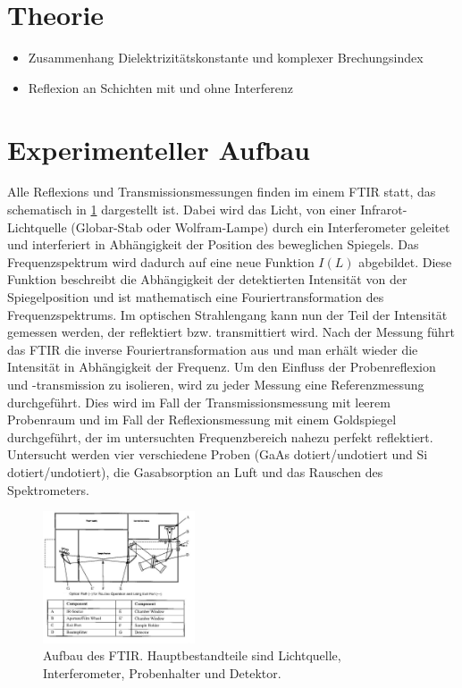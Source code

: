 \documentclass[paper=a4,fontsize=10pt,DIV=18,twocolumn,parskip=half]{scrartcl}
\numberwithin{equation}{section}    %
\begin{document}

\section{Theorie}
\begin{itemize}
\item Zusammenhang Dielektrizitätskonstante und komplexer Brechungsindex
\item Reflexion an Schichten mit und ohne Interferenz
\end{itemize}


\section{Experimenteller Aufbau}

Alle Reflexions und Transmissionsmessungen finden im einem  FTIR statt, das schematisch in \ref{ftir} dargestellt ist. Dabei wird das Licht, von einer Infrarot-Lichtquelle (Globar-Stab oder Wolfram-Lampe) durch ein Interferometer geleitet und interferiert in Abhängigkeit der Position des beweglichen Spiegels. Das Frequenzspektrum wird dadurch auf eine neue Funktion $I(L)$ abgebildet. Diese Funktion beschreibt die Abhängigkeit der detektierten Intensität von der Spiegelposition und ist mathematisch eine Fouriertransformation des Frequenzspektrums. Im optischen Strahlengang kann nun der Teil der Intensität gemessen werden, der reflektiert bzw. transmittiert wird. Nach der Messung führt das FTIR die inverse Fouriertransformation aus und man erhält wieder die  Intensität in Abhängigkeit der Frequenz. Um den Einfluss der Probenreflexion und -transmission zu isolieren, wird zu jeder Messung eine Referenzmessung durchgeführt. Dies wird im Fall der Transmissionsmessung mit leerem Probenraum und im Fall der Reflexionsmessung mit einem Goldspiegel durchgeführt, der im untersuchten Frequenzbereich nahezu perfekt reflektiert.
Untersucht werden vier verschiedene Proben (GaAs dotiert/undotiert und Si dotiert/undotiert), die Gasabsorption an Luft und das Rauschen des Spektrometers.

\begin{figure}
\centering
    \includegraphics[width=0.4\textwidth]{Bilder/FTIR}
    \caption{Aufbau des FTIR. Hauptbestandteile sind Lichtquelle, Interferometer, Probenhalter und Detektor.}
    \label{ftir}
\end{figure}
\end{document}
